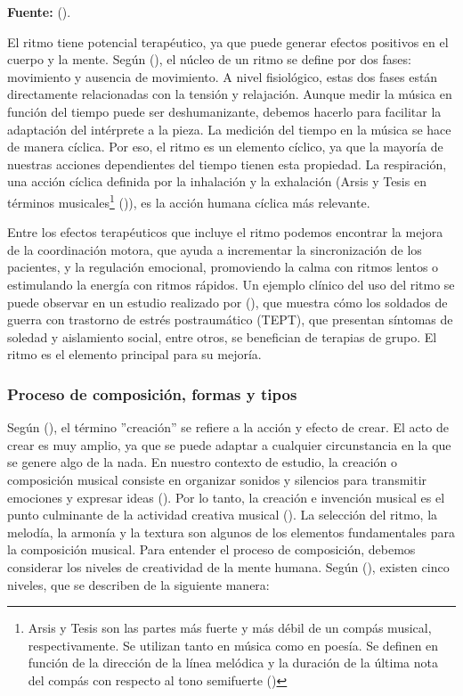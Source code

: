 \begin{center}
	\textbf{Fuente:} \citeauthor{VIOLÍNZN:2024} (\citeyear{VIOLÍNZN:2024}).
\end{center}

El ritmo tiene potencial terapéutico, ya que puede generar efectos positivos en el cuerpo y la mente. Según \citeauthor{JARAH:1977} (\citeyear{JARAH:1977}), el núcleo de un ritmo se define por dos fases: movimiento y ausencia de movimiento. A nivel fisiológico, estas dos fases están directamente relacionadas con la tensión y relajación. Aunque medir la música en función del tiempo puede ser deshumanizante, debemos hacerlo para facilitar la adaptación del intérprete a la pieza. La medición del tiempo en la música se hace de manera cíclica. Por eso, el ritmo es un elemento cíclico, ya que la mayoría de nuestras acciones dependientes del tiempo tienen esta propiedad. La respiración, una acción cíclica definida por la inhalación y la exhalación (Arsis y Tesis en términos musicales\footnote{Arsis y Tesis son las partes más fuerte y más débil de un compás musical, respectivamente. Se utilizan tanto en música como en poesía. Se definen en función de la dirección de la línea melódica y la duración de la última nota del compás con respecto al tono semifuerte (\cite{CASTELLANOS:2009})} (\cite{CASTELLANOS:2009})), es la acción humana cíclica más relevante. 

Entre los efectos terapéuticos que incluye el ritmo podemos encontrar la mejora de la coordinación motora, que ayuda a incrementar la sincronización de los pacientes, y la regulación emocional, promoviendo la calma con ritmos lentos o estimulando la energía con ritmos rápidos. Un ejemplo clínico del uso del ritmo se puede observar en un estudio realizado por \citeauthor{BENSIMON:2008} (\citeyear{BENSIMON:2008}), que muestra cómo los soldados de guerra con trastorno de estrés postraumático (TEPT), que presentan síntomas de soledad y aislamiento social, entre otros, se benefician de terapias de grupo. El ritmo es el elemento principal para su mejoría.

\subsubsection{Proceso de composición, formas y tipos}

Según \citeauthor{RAE:2024} (\citeyear{RAE:2024}), el término ''creación'' se refiere a la acción y efecto de crear. El acto de crear es muy amplio, ya que se puede adaptar a cualquier circunstancia en la que se genere algo de la nada. En nuestro contexto de estudio, la creación o composición musical consiste en organizar sonidos y silencios para transmitir emociones y expresar ideas (\cite{MMARTIN:2024}). Por lo tanto, la creación e invención musical es el punto culminante de la actividad creativa musical (\cite{SUBIRATS:2004}). La selección del ritmo, la melodía, la armonía y la textura son algunos de los elementos fundamentales para la composición musical. Para entender el proceso de composición, debemos considerar los niveles de creatividad de la mente humana. Según \citeauthor{SUBIRATS:2004} (\citeyear{SUBIRATS:2004}), existen cinco niveles, que se describen de la siguiente manera:

